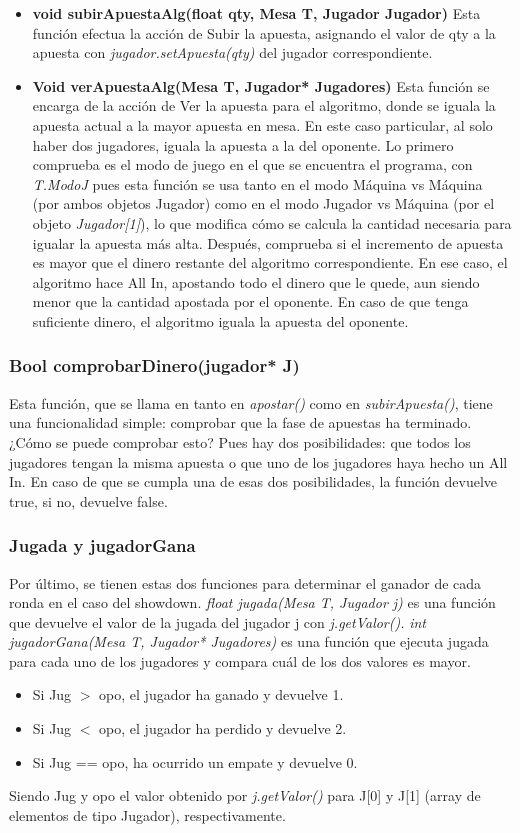 \begin{itemize}
\item \textbf{void subirApuestaAlg(float qty, Mesa T, Jugador Jugador)}
Esta función efectua la acción de Subir la apuesta, asignando el valor de qty a la apuesta con \textit{jugador.setApuesta(qty)} del jugador correspondiente.
\item \textbf{Void verApuestaAlg(Mesa T, Jugador* Jugadores)}
Esta función se encarga de la acción de Ver la apuesta para el algoritmo, donde se iguala la apuesta actual a la mayor apuesta en mesa. En este caso particular, al solo haber dos jugadores, iguala la apuesta a la del oponente.
Lo primero comprueba es el modo de juego en el que se encuentra el programa, con \textit{T.ModoJ} pues esta función se usa tanto en el modo Máquina vs Máquina (por ambos objetos Jugador) como en el modo Jugador vs Máquina (por el objeto \textit{Jugador[1]}), lo que modifica cómo se calcula la cantidad necesaria para igualar la apuesta más alta.
Después, comprueba si el incremento de apuesta es mayor que el dinero restante del algoritmo correspondiente. En ese caso, el algoritmo hace All In, apostando todo el dinero que le quede, aun siendo menor que la cantidad apostada por el oponente. En caso de que tenga suficiente dinero, el algoritmo iguala la apuesta del oponente.

\end{itemize}

\subsubsection{Bool comprobarDinero(jugador* J)}

Esta función, que se llama en tanto en \textit{apostar()} como en \textit{subirApuesta()}, tiene una funcionalidad simple: comprobar que la fase de apuestas ha terminado.
¿Cómo se puede comprobar esto? Pues hay dos posibilidades: que todos los jugadores tengan la misma apuesta o que uno de los jugadores haya hecho un All In.
En caso de que se cumpla una de esas dos posibilidades, la función devuelve true, si no, devuelve false.


\subsubsection{Jugada y jugadorGana }

Por último, se tienen estas dos funciones para determinar el ganador de cada ronda en el caso del showdown.
\textit{float jugada(Mesa T, Jugador j)} es una función que devuelve el valor de la jugada del jugador j con \textit{j.getValor().}
\textit{int jugadorGana(Mesa T, Jugador* Jugadores)} es una función que ejecuta jugada para cada uno de los jugadores y compara cuál de los dos valores es mayor.
\begin{itemize}
\item Si Jug $>$ opo, el jugador ha ganado y devuelve 1.
\item Si Jug $<$ opo, el jugador ha perdido y devuelve 2.
\item Si Jug == opo, ha ocurrido un empate y devuelve 0.
\end{itemize}

Siendo Jug y opo el valor obtenido por \textit{j.getValor()} para J[0] y J[1] (array de elementos de tipo Jugador), respectivamente.